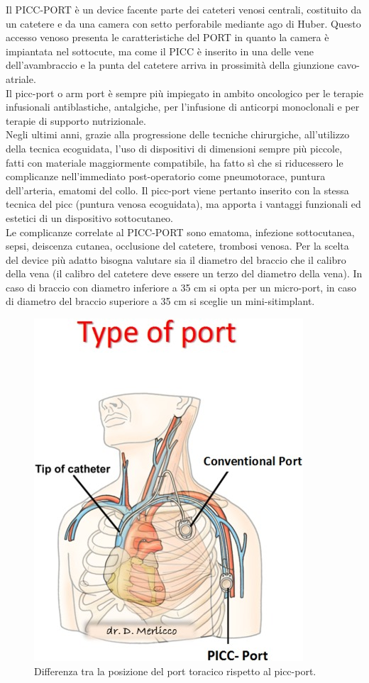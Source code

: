 Il PICC-PORT è un device facente parte dei cateteri venosi centrali, costituito da un catetere e da una camera con 
setto perforabile mediante ago di Huber. Questo accesso venoso presenta le caratteristiche del PORT in quanto la 
camera è impiantata nel sottocute, ma come il PICC è inserito in una delle vene dell’avambraccio e la punta del 
catetere arriva in prossimità della giunzione cavo-atriale\cite{CRO}.\\
Il picc-port o arm port è sempre più impiegato in ambito oncologico per le terapie infusionali antiblastiche, 
antalgiche, per l’infusione di anticorpi monoclonali e per terapie di supporto nutrizionale\cite{GAVECELTPICCPORT}.\\
Negli ultimi anni, grazie alla progressione delle tecniche chirurgiche, all’utilizzo della tecnica ecoguidata, 
l’uso di dispositivi di dimensioni sempre più piccole, fatti con materiale maggiormente compatibile, ha fatto sì che 
si riducessero le complicanze nell’immediato post-operatorio come pneumotorace, puntura dell’arteria, 
ematomi del collo. Il picc-port viene pertanto inserito con la stessa tecnica del picc (puntura venosa ecoguidata), 
ma apporta i vantaggi funzionali ed estetici di un dispositivo sottocutaneo\cite{MERLICCO}.\\
Le complicanze correlate al PICC-PORT sono ematoma, infezione sottocutanea, sepsi, deiscenza cutanea, occlusione del 
catetere, trombosi venosa. 
Per la scelta del device più adatto bisogna valutare sia il diametro del braccio che il calibro della vena 
(il calibro del catetere deve essere un terzo del diametro della vena). In caso di braccio con diametro inferiore a 
35 cm si opta per un micro-port, in caso di diametro del braccio superiore a 35 cm si sceglie un 
mini-sitimplant\cite{GAVECELTPICCPORT}.\\

\begin{figure}[H]
    \begin{center}
    \includegraphics[width=0.4\columnwidth]{img/picc-port.jpg}
    \end{center}
    \caption[Differenza tra la posizione del port toracico rispetto al picc-port.]{Differenza tra la posizione del port toracico rispetto al picc-port.
    \cite{img48}}

\end{figure}

